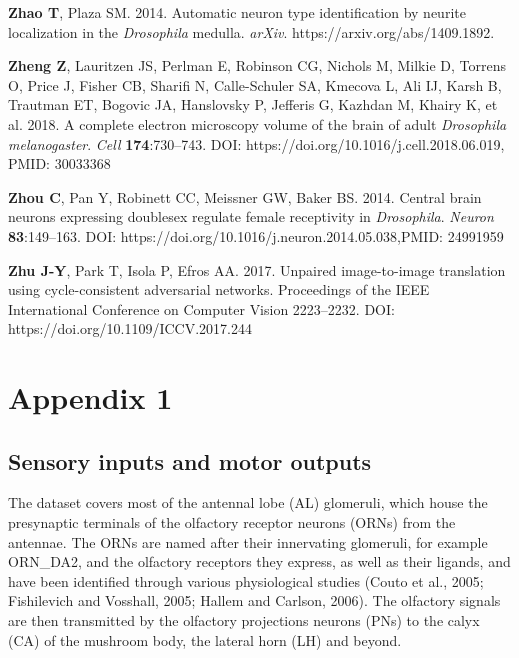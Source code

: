 \documentclass{article}
\begin{document}
\begin{hangpars}
\textbf{Zhao T}, Plaza SM. 2014. Automatic neuron type identification by neurite localization in the \emph{Drosophila} medulla. \emph{arXiv}. https://arxiv.org/abs/1409.1892.

\textbf{Zheng Z}, Lauritzen JS, Perlman E, Robinson CG, Nichols M, Milkie D, Torrens O, Price J, Fisher CB, Sharifi N, Calle-Schuler SA, Kmecova L, Ali IJ, Karsh B, Trautman ET, Bogovic JA, Hanslovsky P, Jefferis G, Kazhdan M, Khairy K, et al. 2018. A complete electron microscopy volume of the brain of adult \emph{Drosophila melanogaster}. \emph{Cell} \textbf{174}:730–743. DOI: https://doi.org/10.1016/j.cell.2018.06.019, PMID: 30033368

\textbf{Zhou C}, Pan Y, Robinett CC, Meissner GW, Baker BS. 2014. Central brain neurons expressing doublesex regulate female receptivity in \emph{Drosophila}. \emph{Neuron} \textbf{83}:149–163. DOI: https://doi.org/10.1016/j.neuron.2014.05.038,PMID: 24991959

\textbf{Zhu J-Y}, Park T, Isola P, Efros AA. 2017. Unpaired image-to-image translation using cycle-consistent adversarial networks. Proceedings of the IEEE International Conference on Computer Vision 2223–2232. DOI: https://doi.org/10.1109/ICCV.2017.244

\end{hangpars}

\section*{Appendix 1}

\subsection*{Sensory inputs and motor outputs}

The dataset covers most of the antennal lobe (AL) glomeruli, which house the presynaptic terminals of the olfactory receptor neurons (ORNs) from the antennae. The ORNs are named after their innervating glomeruli, for example ORN\_DA2, and the olfactory receptors they express, as well as their ligands, and have been identified through various physiological studies (Couto et al., 2005; Fishilevich and Vosshall, 2005; Hallem and Carlson, 2006). The olfactory signals are then transmitted by the olfactory projections neurons (PNs) to the calyx (CA) of the mushroom body, the lateral horn (LH) and beyond.
\end{document}
